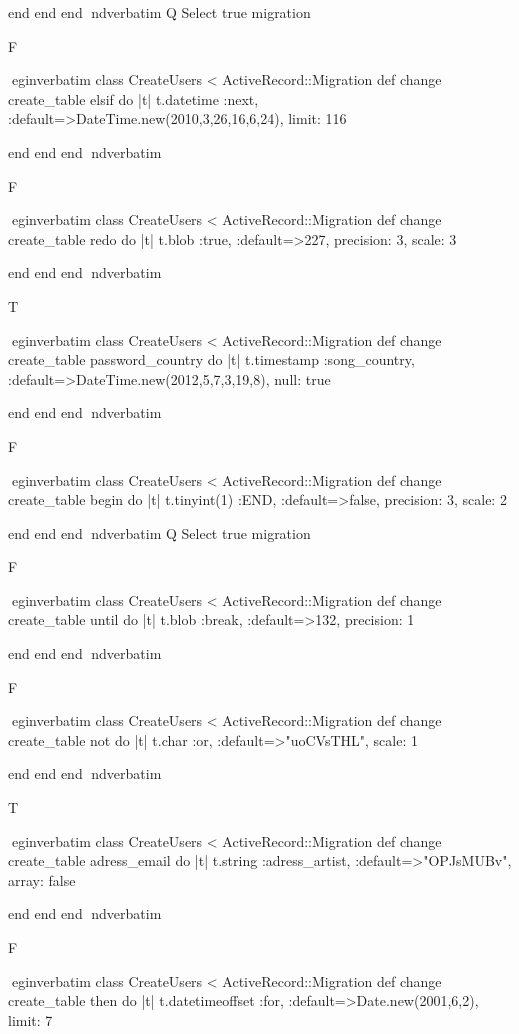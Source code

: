     end 
  end 
end
nd{verbatim}
Q
 Select true migration

F

egin{verbatim}
 class CreateUsers < ActiveRecord::Migration 
  def change 
    create_table elsif do |t| 
      t.datetime :next, :default=>DateTime.new(2010,3,26,16,6,24), limit: 116
    
    end 
  end 
end
nd{verbatim}

F

egin{verbatim}
 class CreateUsers < ActiveRecord::Migration 
  def change 
    create_table redo do |t| 
      t.blob :true, :default=>227, precision: 3, scale: 3
    
    end 
  end 
end
nd{verbatim}

T

egin{verbatim}
 class CreateUsers < ActiveRecord::Migration 
  def change 
    create_table password_country do |t| 
      t.timestamp :song_country, :default=>DateTime.new(2012,5,7,3,19,8), null: true
    
    end 
  end 
end
nd{verbatim}

F

egin{verbatim}
 class CreateUsers < ActiveRecord::Migration 
  def change 
    create_table begin do |t| 
      t.tinyint(1) :END, :default=>false, precision: 3, scale: 2
    
    end 
  end 
end
nd{verbatim}
Q
 Select true migration

F

egin{verbatim}
 class CreateUsers < ActiveRecord::Migration 
  def change 
    create_table until do |t| 
      t.blob :break, :default=>132, precision: 1
    
    end 
  end 
end
nd{verbatim}

F

egin{verbatim}
 class CreateUsers < ActiveRecord::Migration 
  def change 
    create_table not do |t| 
      t.char :or, :default=>"uoCVsTHL", scale: 1
    
    end 
  end 
end
nd{verbatim}

T

egin{verbatim}
 class CreateUsers < ActiveRecord::Migration 
  def change 
    create_table adress_email do |t| 
      t.string :adress_artist, :default=>"OPJsMUBv", array: false
    
    end 
  end 
end
nd{verbatim}

F

egin{verbatim}
 class CreateUsers < ActiveRecord::Migration 
  def change 
    create_table then do |t| 
      t.datetimeoffset :for, :default=>Date.new(2001,6,2), limit: 7
    
